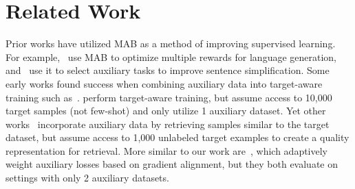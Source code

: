 \section{Related Work}


Prior works have utilized MAB as a method of improving supervised learning. For example,~\citet{Pasunuru2020DORBDO} use MAB to optimize multiple rewards for language generation, and~\citet{Guo2018DynamicMM} use it to select auxiliary tasks to improve sentence simplification.
Some early works found success when combining auxiliary data into target-aware training such as~\citep{10.1145/1015330.1015436}. \citet{chen2022weighted} perform target-aware training, but assume access to 10,000 target samples (not few-shot) and only utilize 1 auxiliary dataset. Yet other works~\citep{Lin2022UnsupervisedCG,Ivison2022DEFT} incorporate auxiliary data by retrieving samples similar to the target dataset, but assume access to 1,000 unlabeled target examples to create a quality representation for retrieval. More similar to our work are~\citet{Verboven2022, https://doi.org/10.48550/arxiv.1812.02224}, which adaptively weight auxiliary losses based on gradient alignment, but they both evaluate on settings with only 2 auxiliary datasets.









